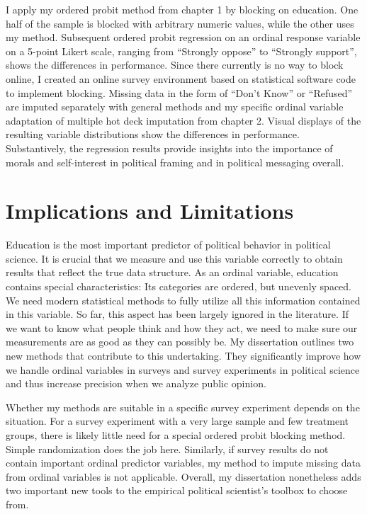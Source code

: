 \documentclass[11pt]{article}
\begin{document}
I apply my ordered probit method from chapter 1 by blocking on education. One half of the sample is blocked with arbitrary numeric values, while the other uses my method. Subsequent ordered probit regression on an ordinal response variable on a 5-point Likert scale, ranging from ``Strongly oppose'' to ``Strongly support'', shows the differences in performance. Since there currently is no way to block online, I created an online survey environment based on statistical software code to implement blocking. Missing data in the form of ``Don't Know'' or ``Refused'' are imputed separately with general methods and my specific ordinal variable adaptation of multiple hot deck imputation from chapter 2. Visual displays of the resulting variable distributions show the differences in performance. Substantively, the regression results provide insights into the importance of morals and self-interest in political framing and in political messaging overall. 

\section*{Implications and Limitations}

Education is the most important predictor of political behavior in political science. It is crucial that we measure and use this variable correctly to obtain results that reflect the true data structure. As an ordinal variable, education contains special characteristics: Its categories are ordered, but unevenly spaced. We need modern statistical methods to fully utilize all this information contained in this variable. So far, this aspect has been largely ignored in the literature. If we want to know what people think and how they act, we need to make sure our measurements are as good as they can possibly be. My dissertation outlines two new methods that contribute to this undertaking. They significantly improve how we handle ordinal variables in surveys and survey experiments in political science and thus increase precision when we analyze public opinion.

Whether my methods are suitable in a specific survey experiment depends on the situation. For a survey experiment with a very large sample and few treatment groups, there is likely little need for a special ordered probit blocking method. Simple randomization does the job here. Similarly, if survey results do not contain important ordinal predictor variables, my method to impute missing data from ordinal variables is not applicable. Overall, my dissertation nonetheless adds two important new tools to the empirical political scientist's toolbox to choose from. 
\end{document}
